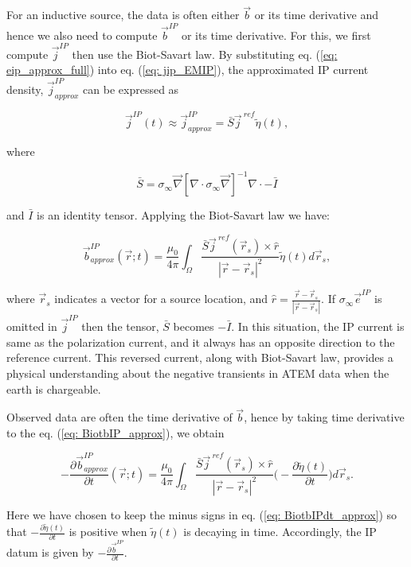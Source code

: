 \documentclass[extra,mreferee]{gji}
\renewcommand{\div}{\nabla\cdot}
\newcommand{\grad}{\vec \nabla}
\newcommand{\siginf}{\sigma_\infty}
\renewcommand {\j}  { {\vec j} }
\renewcommand {\b}  { {\vec b} }
\newcommand {\e}  { {\vec e} }
\newcommand{\peta}{\tilde{\eta}}
\newcommand{\jref}{\j^{\ ref}}
\begin{document}
For an inductive source, the data is often either $\b$ or its time derivative and hence we also need to compute $\b^{IP}$ or its time derivative.
For this, we first compute $\j^{IP}$ then use the Biot-Savart law. 
By substituting eq. (\ref{eq: eip_approx_full}) into eq. (\ref{eq: jip_EMIP}), the approximated IP current density, $\j^{IP}_{approx}$ can be expressed as
\begin{linenomath*}
\begin{equation}
  \j^{IP}(t) \approx \j^{IP}_{approx} = \bar{S}\jref\peta(t),
  \label{eq: jip_approx}
\end{equation}
\end{linenomath*}
where
\begin{linenomath*}
\begin{equation}
  \bar{S} = \siginf\grad[\div \siginf\grad]^{-1}\div-\bar{I}
\end{equation}
\end{linenomath*}
and $\bar{I}$ is an identity tensor. 
Applying the Biot-Savart law we have:
\begin{linenomath*}
\begin{equation}
  \b^{IP}_{approx}(\vec{r}; t) = \frac{\mu_0}{4\pi}\int_{\Omega}  \frac{\bar{S}\j^{\ ref}(\vec{r}_s)\times\hat{r}}{|\vec{r}-\vec{r}_s|^2}\peta(t)d\vec{r}_s,
  \label{eq: BiotbIP_approx}
\end{equation}
\end{linenomath*}
where $\vec{r}_s$ indicates a vector for a source location, and $\hat{r}=\frac{\vec{r}-\vec{r}_s}{|\vec{r}-\vec{r}_s|}$.
If $\siginf\e^{IP}$ is omitted in  $\j^{IP}$ then the tensor, $\bar{S}$ becomes $-\bar{I}$. 
In this situation, the IP current is same as the polarization current, and it always has an opposite direction to the reference current. 
This reversed current, along with Biot-Savart law,  provides a physical understanding about the negative transients in ATEM data when the earth is chargeable. 

Observed data are often the time derivative of $\b$, hence by taking time derivative to the eq. (\ref{eq: BiotbIP_approx}), we obtain
\begin{linenomath*}
\begin{equation}
  -\frac{\partial\b^{IP}_{approx}}{\partial t}(\vec{r}; t) = \frac{\mu_0}{4\pi} \int_{\Omega}  \frac{\bar{S}\jref(\vec{r}_s)\times\hat{r}}{|\vec{r}-\vec{r}_s|^2} \Big( -\frac{\partial \peta(t)}{\partial t} \Big) d\vec{r}_s.
  \label{eq: BiotbIPdt_approx}
\end{equation}
\end{linenomath*}
Here we have chosen to keep the minus signs in eq. (\ref{eq: BiotbIPdt_approx}) so that $-\frac{\partial \peta(t)}{\partial t}$ is positive when $\peta(t)$ is decaying in time. 
Accordingly, the IP datum is given by  $-\frac{\partial\b^{IP}}{\partial t}$. 
\end{document}
